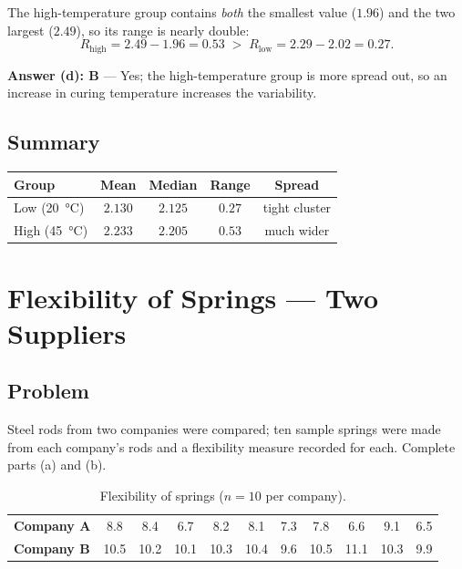 \documentclass[11pt]{article}
\begin{document}
\noindent
The high-temperature group contains \emph{both} the smallest value ($1.96$) and
the two largest ($2.49$), so its range is nearly double:
\[
R_{\text{high}}=2.49-1.96=0.53 \;>\; R_{\text{low}}=2.29-2.02=0.27 .
\]

\begin{answerbox}
\textbf{Answer (d): B} --- Yes; the high-temperature group is more spread out, so
an increase in curing temperature increases the variability.
\end{answerbox}

\subsection*{Summary}
\begin{center}
\renewcommand{\arraystretch}{1.25}
\begin{tabular}{l c c c c}
\toprule
Group & Mean & Median & Range & Spread \\
\midrule
Low (\SI{20}{\celsius})  & $2.130$ & $2.125$ & $0.27$ & tight cluster \\
High (\SI{45}{\celsius}) & $2.233$ & $2.205$ & $0.53$ & much wider \\
\bottomrule
\end{tabular}
\end{center}

\section{Flexibility of Springs --- Two Suppliers}

\subsection*{Problem}
Steel rods from two companies were compared; ten sample springs were made from
each company's rods and a flexibility measure recorded for each. Complete parts
(a) and (b).

\begin{table}[H]
\centering
\renewcommand{\arraystretch}{1.25}
\begin{tabular}{l *{10}{c}}
\toprule
\textbf{Company A} & 8.8 & 8.4 & 6.7 & 8.2 & 8.1 & 7.3 & 7.8 & 6.6 & 9.1 & 6.5 \\
\textbf{Company B} & 10.5 & 10.2 & 10.1 & 10.3 & 10.4 & 9.6 & 10.5 & 11.1 & 10.3 & 9.9 \\
\bottomrule
\end{tabular}
\caption{Flexibility of springs ($n=10$ per company).}
\end{table}
\end{document}
